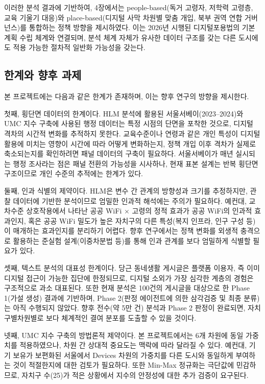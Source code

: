 이러한 분석 결과에 기반하여, 4장에서는 people-based(독거 고령자, 저학력 고령층, 교육 기울기 대응)와 place-based(디지털 사막 차원별 맞춤 개입, 북부 권역 연합 거버넌스)를 통합하는 정책 방향을 제시하였다. 이는 2026년 시행된 디지털포용법의 기본계획 수립 체계와 연결되며, 분석 체계 자체가 유사한 데이터 구조를 갖는 다른 도시에도 적용 가능한 절차적 일반화 가능성을 갖는다.

\subsection{한계와 향후 과제}
\label{subsec:5-2}

본 프로젝트에는 다음과 같은 한계가 존재하며, 이는 향후 연구의 방향을 제시한다.

첫째, 횡단면 데이터의 한계이다. HLM 분석에 활용된 서울서베이(2023--2024)와 UMC 지수 구축에 사용된 행정 데이터는 특정 시점의 단면을 포착한 것으로, 디지털 격차의 시간적 변화를 추적하지 못한다. 교육수준이나 연령과 같은 개인 특성이 디지털 활용에 미치는 영향이 시간에 따라 어떻게 변화하는지, 정책 개입 이후 격차가 실제로 축소되는지를 확인하려면 패널 데이터의 구축이 필요하다. 서울서베이가 매년 실시되는 행정 조사라는 점은 패널 전환의 가능성을 시사하나, 현재 표본 설계는 반복 횡단면 구조이므로 개인 수준의 추적에는 한계가 있다.

둘째, 인과 식별의 제약이다. HLM은 변수 간 관계의 방향성과 크기를 추정하지만, 관찰 데이터에 기반한 분석이므로 엄밀한 인과적 해석에는 주의가 필요하다. 예컨대, 교차수준 상호작용에서 나타난 공공 WiFi $\times$ 고령의 정적 효과가 공공 WiFi의 인과적 효과인지, 혹은 공공 WiFi 밀도가 높은 자치구의 다른 특성(복지 인프라, 인구 구성 등)이 매개하는 효과인지를 분리하기 어렵다. 향후 연구에서는 정책 변화를 외생적 충격으로 활용하는 준실험 설계(이중차분법 등)를 통해 인과 관계를 보다 엄밀하게 식별할 필요가 있다.

셋째, 텍스트 분석의 대표성 한계이다. 당근 동네생활 게시글은 플랫폼 이용자, 즉 이미 디지털 접근이 가능한 집단에 한정되므로, 디지털 소외가 가장 심각한 계층의 경험은 구조적으로 과소 대표된다. 또한 현재 분석은 100건의 게시글을 대상으로 한 Phase 1(가설 생성) 결과에 기반하며, Phase 2(판정 에이전트에 의한 삼각검증 및 최종 분류)는 아직 수행되지 않았다. 향후 전수(약 5만 건) 분석과 Phase 2 판정이 완료되면, 자치구별\textperiodcentered{}차원별로 보다 체계적인 결여 분포를 도출할 수 있을 것이다.

넷째, UMC 지수 구축의 방법론적 제약이다. 본 프로젝트에서는 6개 차원에 동일 가중치를 적용하였으나, 차원 간 상대적 중요도는 맥락에 따라 달라질 수 있다. 예컨대, 기기 보유가 보편화된 서울에서 Devices 차원의 가중치를 다른 도시와 동일하게 부여하는 것이 적절한지에 대한 검토가 필요하다. 또한 Min-Max 정규화는 극단값에 민감하므로, 자치구 수(25)가 적은 상황에서 지수의 안정성에 대한 추가 검증이 요구된다.

